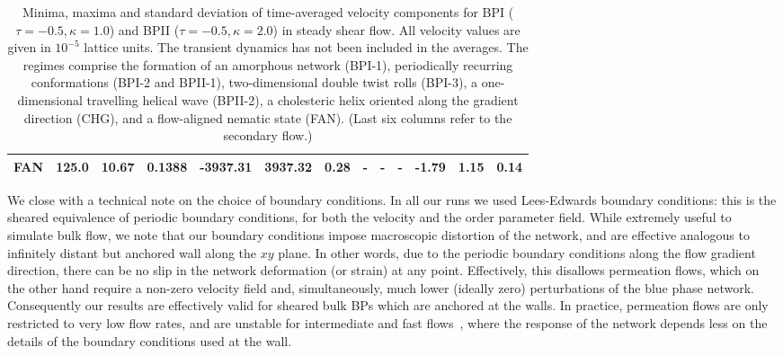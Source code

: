 \documentclass[8.5pt,twoside,twocolumn]{article}
\begin{document}
\begin{table}[htpb]
\begin{tabular}{|c||c|| c || c || c |c |c||c| c| c||c| c| c|}
\hline
FAN & 125.0 &10.67 & 0.1388 &-3937.31  & 3937.32 &0.28 &-  &-  &-  &-1.79 &1.15  &0.14 \\
\hline
\end{tabular}
\caption{Minima, maxima and standard deviation of time-averaged velocity components 
for BPI ($\tau=-0.5, \kappa=1.0$) and BPII ($\tau=-0.5, \kappa=2.0$) in steady 
shear flow. All velocity values are given in $10^{-5}$ lattice units. The transient dynamics 
has not been included in the averages. The regimes comprise the formation
of an amorphous network (BPI-1), periodically recurring conformations (BPI-2 and BPII-1), 
two-dimensional double twist rolls (BPI-3), a one-dimensional travelling helical wave (BPII-2), 
a cholesteric helix oriented along the gradient direction (CHG), 
and a flow-aligned nematic state (FAN).
(Last six columns refer to the secondary flow.)}
\label{tab1}
\end{table}

We close with a technical note on the choice of boundary conditions. 
In all our runs we used Lees-Edwards boundary conditions: this
is the sheared equivalence of periodic boundary conditions, for both the 
velocity and the order parameter field. 
While extremely useful to simulate bulk flow, we
note that our boundary conditions impose macroscopic distortion
of the network, and are effective analogous to infinitely distant
but anchored wall along the $xy$ plane. In other words, due to
the periodic boundary conditions along the flow gradient direction, 
there can be no slip in the network deformation (or strain) at any point. 
Effectively, this disallows permeation flows, which on the other
hand require a non-zero velocity field and, simultaneously,
much lower (ideally zero) perturbations of the blue phase network.
Consequently our results are effectively valid for sheared bulk 
BPs which are anchored at the walls. In practice, permeation flows are 
only restricted to very low flow rates, and are unstable for intermediate 
and fast flows~\cite{Dupuis:2005}, 
where the response of the network depends less on
the details of the boundary conditions used at the wall.
\newpage

\footnotesize{
}
\end{document}
